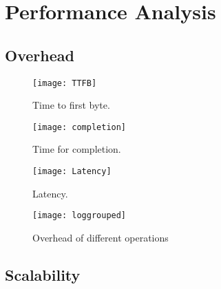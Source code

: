 \section{Performance Analysis}
\label{sec:performance}

\subsection{\system{} Overhead}

\begin{figure}[t!]
\centering
\texttt{[image: TTFB]}
\caption{Time to first byte.}
\label{fig:ttfb}
\end{figure}

\begin{figure}[t!]
\centering
\texttt{[image: completion]}
\caption{Time for completion.}
\label{fig:completion}
\end{figure}

\begin{figure}[t!]
\centering
\texttt{[image: Latency]}
\caption{Latency.}
\label{fig:latency}
\end{figure}

\begin{figure}[t!]
\centering
\texttt{[image: loggrouped]}
\caption{Overhead of different operations}
\label{fig:overhead2}
\end{figure}

\subsection{Scalability}

